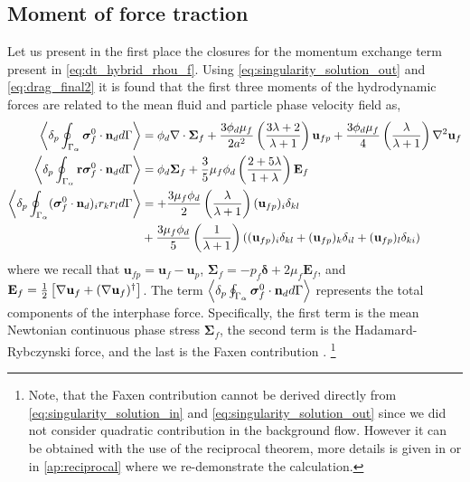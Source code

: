 \subsection{Moment of force traction}

Let us present in the first place the closures for the momentum exchange term present in \ref{eq:dt_hybrid_rhou_f}. 
Using \ref{eq:singularity_solution_out} and \ref{eq:drag_final2} it is found that the first three moments of the hydrodynamic forces are related to the mean fluid and particle phase velocity field as, 
\begin{align}
    \label{eq:zeroth_mom}
    \pSavg{\bm{\sigma}_f^0\cdot \textbf{n}_d} &= 
    \phi_d \div\bm\Sigma_f
    + \frac{3\phi_d\mu_f}{2 a^2} 
    \left(\frac{3\lambda+2}{\lambda+1}\right) \textbf{u}_{f p} 
    + \frac{3\phi_d\mu_f}{4} \left(\frac{\lambda}{\lambda+1}\right)\grad^2\textbf{u}_f\\
    \label{eq:first_mom}
    \pavg{\intS{\textbf{r}\bm{\sigma}_f^0 \cdot \textbf{n}_d}} 
    &= 
    \phi_d \bm\Sigma_f + 
    \frac{3}{5}\mu_f \phi_d \left(\frac{2+5\lambda}{1+\lambda}\right)
    \textbf{E}_f
    \\
    \label{eq:second_mom}
        \pavg{\intS{(\bm{\sigma}_f^0 \cdot \textbf{n}_d)_ir_kr_l}} &=
        + \frac{3\mu_f\phi_d}{2}\left(\frac{\lambda}{\lambda+1}\right)(\textbf{u}_{fp})_i\delta_{kl}\\
        &+ \frac{3\mu_f\phi_d}{5}\left(\frac{1}{\lambda+1}\right)((\textbf{u}_{fp})_i\delta_{kl}+ (\textbf{u}_{fp})_k\delta_{il}+(\textbf{u}_{fp})_l\delta_{ki})\nonumber
\end{align}
where we recall that $\textbf{u}_{fp} = \textbf{u}_f - \textbf{u}_p$, $\bm\Sigma_f = -p_f\bm\delta +2 \mu_f \textbf{E}_f$, and $\textbf{E}_f = \frac{1}{2}\left[\mathbf{\nabla} \textbf{u}_f + (\mathbf{\nabla} \textbf{u}_f)^\dagger\right]$. 
The term $\left<\delta_p \oint_{\Gamma_{\alpha}} \bm{\sigma}_f^0 \cdot \textbf{n}_d d\Gamma\right>$ represents the total components of the interphase force.
Specifically, the first term is the mean Newtonian continuous phase stress $\bm\Sigma_f$, the second term is the Hadamard-Rybczynski force, and the last is the Faxen contribution \citep{kim2013microhydrodynamics}. 
\footnote{Note, that the Faxen contribution cannot be derived directly from \ref{eq:singularity_solution_in} and \ref{eq:singularity_solution_out} since we did not consider quadratic contribution in the background flow.
However it can be obtained with the use of the reciprocal theorem, more details is given in \citet{kim2013microhydrodynamics} or in \ref{ap:reciprocal} where we re-demonstrate the calculation. }
